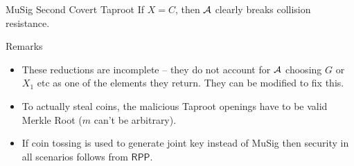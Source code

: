 \documentclass[final]{beamer}
\theoremstyle{definition}
\newcommand{\rpp}{\textsf{RPP}}
\newlength{\onecolwid}
\newlength{\twocolwid}
\begin{document}
\begin{frame}[t]
\begin{columns}[t]
\begin{column}{\twocolwid}
\begin{columns}[t,totalwidth=\twocolwid]
\begin{column}{\onecolwid}
\begin{block}{MuSig Second Covert Taproot}
If $X = C$, then $\mathcal{A}$ clearly breaks collision resistance.

\end{block}

\begin{block}{Remarks}
\begin{itemize}
    \item These reductions are incomplete -- they do not account for $\mathcal{A}$ choosing $G$ or $X_1$ etc as one of the elements they return. They can be modified to fix this.
    \item To actually steal coins, the malicious Taproot openings have to be valid Merkle Root ($m$ can't be arbitrary).
    \item If coin tossing is used to generate joint key instead of MuSig then security in all scenarios follows from $\rpp$.
\end{itemize}



\small{
                     
                     
                     }
\end{block}


\end{column} %
\end{columns}


\end{column}

\end{columns} %

\end{frame} %
\end{document}
